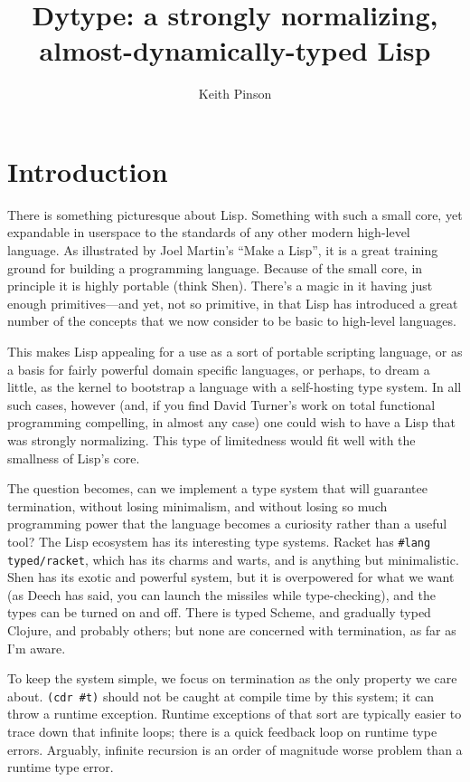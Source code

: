 \documentclass{article}
\title{Dytype: a strongly normalizing, almost-dynamically-typed Lisp}
\author{Keith Pinson}
\begin{document}
\maketitle

\section{Introduction}

There is something picturesque about Lisp. Something with such a small core, yet
expandable in userspace to the standards of any other modern high-level
language. As illustrated by Joel Martin's ``Make a Lisp'', it is a great
training ground for building a programming language. Because of the small core,
in principle it is highly portable (think Shen). There's a magic in it having
just enough primitives---and yet, not so primitive, in that Lisp has introduced
a great number of the concepts that we now consider to be basic to high-level
languages.

This makes Lisp appealing for a use as a sort of portable scripting language, or
as a basis for fairly powerful domain specific languages, or perhaps, to dream a
little, as the kernel to bootstrap a language with a self-hosting type system.
In all such cases, however (and, if you find David Turner's work on total
functional programming compelling, in almost any case) one could wish to have a
Lisp that was strongly normalizing. This type of limitedness would fit well with
the smallness of Lisp's core.

The question becomes, can we implement a type system that will guarantee
termination, without losing minimalism, and without losing so much programming
power that the language becomes a curiosity rather than a useful tool? The Lisp
ecosystem has its interesting type systems. Racket has \texttt{\#lang
typed/racket}, which has its charms and warts, and is anything but minimalistic.
Shen has its exotic and powerful system, but it is overpowered for what we want
(as Deech has said, you can launch the missiles while type-checking),
and the types can be turned on and off. There is typed Scheme, and gradually
typed Clojure, and probably others; but none are concerned with termination, as
far as I'm aware.

To keep the system simple, we focus on termination as the only property we care
about. \texttt{(cdr \#t)} should not be caught at compile time by this system;
it can throw a runtime exception. Runtime exceptions of that sort are typically
easier to trace down that infinite loops; there is a quick feedback loop on
runtime type errors. Arguably, infinite recursion is an order of magnitude worse
problem than a runtime type error.
\end{document}
